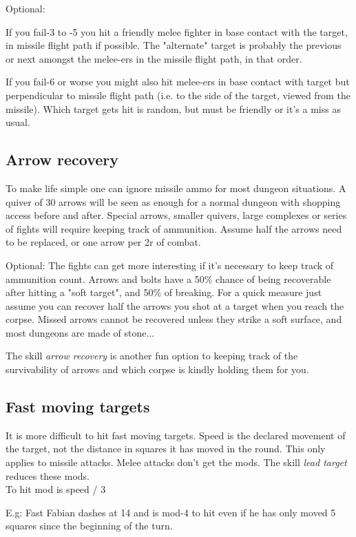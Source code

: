\noindent Optional:

If you fail-3 to -5 you hit a friendly melee fighter in base contact with the target, in missile flight path if possible. The "alternate" target is probably the previous or next amongst the melee-ers in the missile flight path, in that order.

If you fail-6 or worse you might also hit melee-ers in base contact with target but perpendicular to missile flight path (i.e. to the side of the target, viewed from the missile). Which target gets hit is random, but must be friendly or it's a miss as usual.



\subsection*{Arrow recovery}
To make life simple one can ignore missile ammo for most dungeon situations. A quiver of 30 arrows will be seen as enough for a normal dungeon with shopping access before and after. Special arrows, smaller quivers, large complexes or series of fights will require keeping track of ammunition. Assume half the arrows need to be replaced, or one arrow per 2r of combat.

Optional: The fights can get more interesting if it's necessary to keep track of ammunition count.
Arrows and bolts have a 50\% chance of being recoverable after hitting a "soft target", and 50\% of breaking. For a quick measure just assume you can recover half the arrows you shot at a target when you reach the corpse.
Missed arrows cannot be recovered unless they strike a soft surface, and most dungeons are made of stone...

The skill \emph{arrow recovery} is another fun option to keeping track of the survivability of arrows and which corpse is kindly holding them for you.


\subsection*{Fast moving targets}
It is more difficult to hit fast moving targets. Speed is the declared movement of the target, not the distance in squares it has moved in the round. This only applies to missile attacks. Melee attacks don't get the mods. The skill \emph{lead target} reduces these mods. \\
To hit mod is speed / 3

E.g: Fast Fabian dashes at 14 and is mod-4 to hit even if he has only moved 5 squares since the beginning of the turn.


